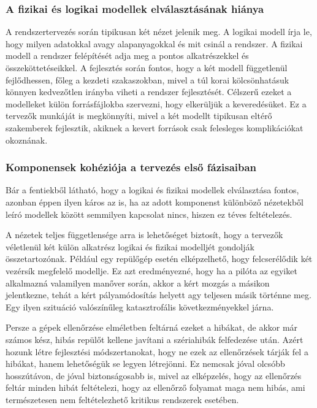         \subsubsection{A fizikai és logikai modellek elválasztásának hiánya} \label{sec:LogFiz}
        A rendszertervezés során tipikusan két nézet jelenik meg. A logikai modell írja le, hogy milyen adatokkal avagy alapanyagokkal és mit csinál a rendszer.
        A fizikai modell a rendszer felépítését adja meg a pontos alkatrészekkel és összeköttetéseikkel.
        A fejlesztés során fontos, hogy a két modell függetlenül fejlődhessen, főleg a kezdeti szakaszokban, mivel a túl korai kölcsönhatásuk könnyen kedvezőtlen irányba viheti a rendszer fejlesztését.
        Célszerű ezeket a modelleket külön forrásfájlokba szervezni, hogy elkerüljük a keveredésüket.
        Ez a tervezők munkáját is megkönnyíti, mivel a két modellt tipikusan eltérő szakemberek fejlesztik, akiknek a kevert források csak felesleges komplikációkat okoznának.
        
        \subsubsection{Komponensek kohéziója a tervezés első fázisaiban}
        Bár a fentiekből látható, hogy a logikai és fizikai modellek elválasztása fontos, azonban éppen ilyen káros az is, ha az adott komponenst különböző nézetekből leíró modellek között semmilyen kapcsolat nincs, hiszen ez téves feltételezés.
        
        A nézetek teljes függetlensége arra is lehetőséget biztosít, hogy a tervezők véletlenül két külön alkatrész logikai és fizikai modelljét gondolják összetartozónak.
        Például egy repülőgép esetén elképzelhető, hogy felcserélődik két vezérsík megfelelő modellje. Ez azt eredményezné, hogy ha a pilóta az egyiket alkalmazná valamilyen manőver során, akkor a kért mozgás a másikon jelentkezne, tehát a kért pályamódosítás helyett agy teljesen másik történne meg.
        Egy ilyen szituáció valószínűleg katasztrofális következményekkel járna.
        
        Persze a gépek ellenőrzése elméletben feltárná ezeket a hibákat, de akkor már számos kész, hibás repülőt kellene javítani a szériahibák felfedezése után.
        Azért hozunk létre fejlesztési módszertanokat, hogy ne ezek az ellenőrzések tárják fel a hibákat, hanem lehetőségük se legyen létrejönni.
        Ez nemcsak jóval olcsóbb hosszútávon, de jóval biztonságosabb is, mivel az elképzelés, hogy az ellenőrzés feltár minden hibát feltételezi, hogy az ellenőrző folyamat maga nem hibás, ami természetesen nem feltételezhető kritikus rendszerek esetében.

